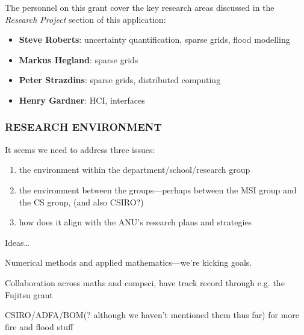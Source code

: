 \documentclass[a4paper,fontsize=12pt]{scrartcl}
\begin{document}
The personnel on this grant cover the key research areas discussed in
the \emph{Research Project} section of this application:

\begin{itemize}
\item \textbf{Steve Roberts}: uncertainty quantification, sparse grids, flood
  modelling
\item \textbf{Markus Hegland}: sparse grids
\item \textbf{Peter Strazdins}: sparse grids, distributed computing
\item \textbf{Henry Gardner}: HCI, interfaces
\end{itemize}

\subsubsection*{RESEARCH ENVIRONMENT}


It seems we need to address three issues: 

\begin{enumerate}
\item the environment within the department/school/research group
\item the environment between the groups---perhaps between the MSI
  group and the CS group, (and also CSIRO?)
\item how does it align with the ANU's research plans and strategies
\end{enumerate}

Ideas\ldots

Numerical methods and applied mathematics---we're kicking goals.

Collaboration across maths and compsci, have track record through e.g.
the Fujitsu grant

CSIRO/ADFA/BOM(? although we haven't mentioned them thus far) for more
fire and flood stuff
\end{document}
